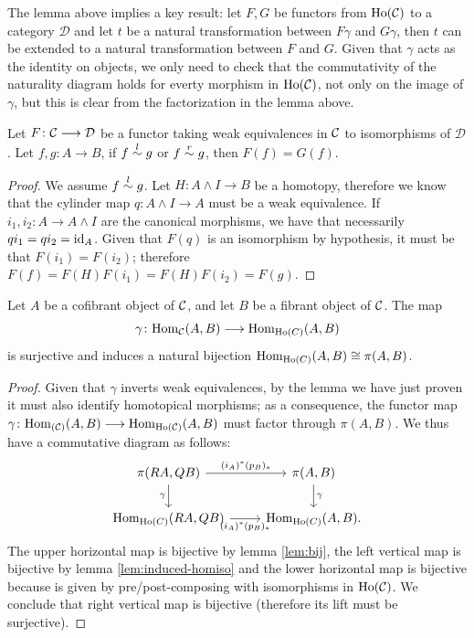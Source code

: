  The lemma above implies a key result: let $F, G$ be functors from $\mathrm{Ho}(\mathcal{C})$ to a category $\mathcal{D}$ and let $t$ be a natural transformation between $F\gamma$ and $G \gamma$, then $t$ can be extended to a natural transformation between $F$ and $G$. Given that $\gamma$ acts as the identity on objects, we only need to check that the commutativity of the naturality diagram holds for everty morphism in $\mathrm{Ho}(\mathcal{C})$, not only on the image of $\gamma$, but this is clear from the factorization in the lemma above.

 \begin{lemma}
	\label{lem:funct-htp}
	Let $F \colon \mathcal{C} \longrightarrow \mathcal{D}$ be a functor taking weak equivalences in $\mathcal{C}$ to isomorphisms of $\mathcal{D}$. Let $f,g\colon A \longrightarrow B$, if $f\mathrel{\overset{l}{\sim}} g$ or $f \mathrel{\overset{r}{\sim}} g$, then $F(f) = G(f)$.
 \end{lemma}
\begin{proof}
	We assume $f \mathrel{\overset{l}{\sim}} g$. Let $H \colon A \wedge I \longrightarrow B$ be a homotopy, therefore we know that the cylinder map $q\colon A\wedge I \longrightarrow A$ must be a weak equivalence. If $i_1,i_2\colon A \longrightarrow A\wedge I$ are the canonical morphisms, we have that necessarily $qi_1 = qi_2 = \mathrm{id}_A$. Given that $F(q)$ is an isomorphism by hypothesis, it must be that $F(i_1)=F(i_2)$; therefore $F(f) = F(H)F(i_1) = F(H)F(i_2) = F(g)$.
\end{proof}


\begin{proposition}
	Let $A$ be a cofibrant object of $\mathcal{C}$, and let $B$ be a fibrant object of $\mathcal{C}$.
	The map 
	\[\gamma \colon \mathrm{Hom}_{\mathcal{C}}(A,B) \longrightarrow \mathrm{Hom}_{\mathrm{Ho}(C)}(A,B) \]
	is surjective and induces a natural bijection $\mathrm{Hom}_{\mathrm{Ho}(C)}(A,B) \cong \pi(A,B)$.
\end{proposition}
\begin{proof}
	Given that $\gamma$ inverts weak equivalences, by the lemma we have just proven it must also identify homotopical morphisms; as a consequence, the functor map $\gamma \colon\mathrm{Hom}_{(\mathcal{C})}(A,B) \longrightarrow \mathrm{Hom}_{\mathrm{Ho}(\mathcal{C})}(A,B)$ must factor through $\pi(A,B)$. We thus have a commutative diagram as follows:
	\[\begin{tikzcd}
		{\pi(RA,QB)} & {\pi(A,B)} \\
		{\Hom_{\ho(C)}(RA,QB)} & {\Hom_{\ho(C)}(A,B).}
		\arrow["{(i_A)^*(p_B)_*}", from=1-1, to=1-2]
		\arrow["\gamma"', from=1-1, to=2-1]
		\arrow["\gamma", from=1-2, to=2-2]
		\arrow["{(i_A)^*(p_B)_*}"', from=2-1, to=2-2]
	\end{tikzcd}\]
	The upper horizontal map is bijective by lemma \ref{lem:bij}, the left vertical map is bijective by lemma \ref{lem:induced-homiso} and the lower horizontal map is bijective because is given by pre/post-composing with isomorphisms in $\mathrm{Ho}(\mathcal{C})$. We conclude that right vertical map is bijective (therefore its lift must be surjective). 
\end{proof}

